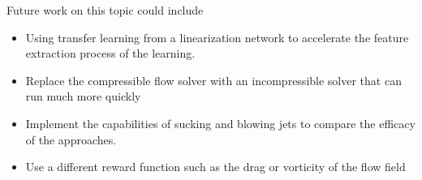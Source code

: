 \documentclass{article}
\begin{document}
Future work on this topic could include
\begin{itemize}
    \item Using transfer learning from a linearization network \cite{morton2018deep} to accelerate the feature extraction process of the learning. 
    \item Replace the compressible flow solver with an incompressible solver that can run much more quickly
    \item Implement the capabilities of sucking and blowing jets to compare the efficacy of the approaches.
    \item Use a different reward function such as the drag or vorticity of the flow field
\end{itemize}






\end{document}
